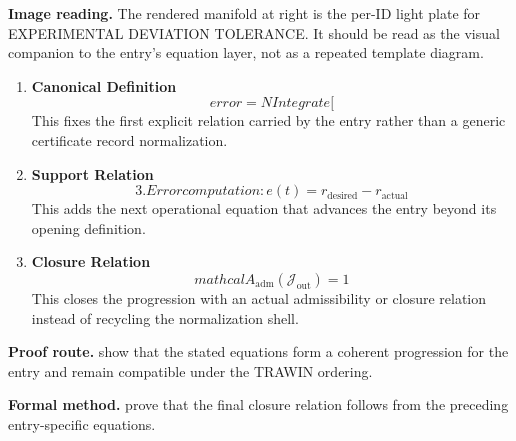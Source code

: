 \begin{samepage}
\noindent\begin{minipage}[t]{0.45\linewidth}
\vspace{0pt}
\raggedright
\scriptsize\textbf{Image reading.} The rendered manifold at right is the per-ID light plate for EXPERIMENTAL DEVIATION TOLERANCE. It should be read as the visual companion to the entry's equation layer, not as a repeated template diagram.\par
\end{minipage}\hfill
\begin{minipage}[t]{0.53\linewidth}
\vspace*{-0.10in}
\raggedright
{}
\end{minipage}
\end{samepage}

\clearpage


\begin{enumerate}[leftmargin=1.6em,itemsep=9pt,topsep=6pt]
\item \textbf{Canonical Definition}
\[
error = NIntegrate[
\]
This fixes the first explicit relation carried by the entry rather than a generic certificate record normalization.

\item \textbf{Support Relation}
\[
3. Error computation: e(t) = r_{\mathrm{desired}} - r_{\mathrm{actual}}
\]
This adds the next operational equation that advances the entry beyond its opening definition.

\item \textbf{Closure Relation}
\[
mathcal{A}_{\mathrm{adm}}\!\left(\mathcal{J}_{\mathrm{out}}\right)=1
\]
This closes the progression with an actual admissibility or closure relation instead of recycling the normalization shell.
\end{enumerate}

\textbf{Proof route.} show that the stated equations form a coherent progression for the entry and remain compatible under the TRAWIN ordering.

\textbf{Formal method.} prove that the final closure relation follows from the preceding entry-specific equations.

\medskip
{}

